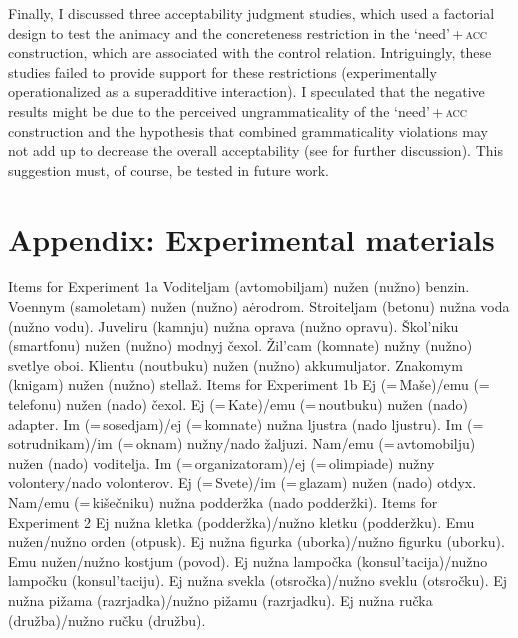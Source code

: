 \documentclass[output=paper]{langscibook}
\begin{document}
Finally, I discussed three acceptability judgment studies, which used a factorial design to test the animacy and the concreteness restriction in the `need'\,+\,\textsc{acc} construction, which are associated with the control relation. Intriguingly, these studies failed to provide support for these restrictions (experimentally operationalized as a superadditive interaction). I speculated that the negative results might be due to the perceived ungrammaticality of the `need'\,+\,\textsc{acc} construction and the hypothesis that combined grammaticality violations may not add up to decrease the overall acceptability (see \citealt{Hofmeister.Casasanto.Staum.Sag2014} for further discussion). This suggestion must, of course, be tested in future work.

\section*{Appendix: Experimental materials}

\ea Items for Experiment 1a
\ea Voditeljam (avtomobiljam) nužen (nužno) benzin.
\ex  Voennym (samoletam) nužen (nužno) aėrodrom.
\ex  Stroiteljam (betonu) nužna voda (nužno vodu).
\ex  Juveliru (kamnju) nužna oprava (nužno opravu).
\ex  Škol'niku (smartfonu) nužen (nužno) modnyj čexol.
\ex  Žil'cam (komnate) nužny (nužno) svetlye oboi.
\ex  Klientu (noutbuku) nužen (nužno) akkumuljator.
\ex  Znakomym (knigam) nužen (nužno) stellaž.
\z \ex Items for Experiment 1b
\ea Ej (=\,Maše)\slash emu (=\,telefonu) nužen (nado) čexol.
\ex Ej (=\,Kate)\slash emu (=\,noutbuku) nužen (nado) adapter.
\ex  Im (=\,sosedjam)\slash ej (=\,komnate) nužna ljustra (nado ljustru).
\ex  Im (=\,sotrudnikam)\slash im (=\,oknam) nužny\slash nado žaljuzi.
\ex  Nam\slash emu (=\,avtomobilju) nužen (nado) voditelja.
\ex  Im (=\,organizatoram)\slash ej (=\,olimpiade) nužny volontery\slash nado volonterov.
\ex  Ej (=\,Svete)\slash im (=\,glazam) nužen (nado) otdyx.
\ex  Nam\slash emu (=\,kišečniku) nužna podderžka (nado podderžki).
\z \ex Items for Experiment 2
\ea Ej nužna kletka (podderžka)\slash nužno  kletku (podderžku).
\ex Emu nužen\slash nužno  orden (otpusk).
\ex Ej nužna figurka (uborka)\slash nužno  figurku (uborku).
\ex Emu nužen\slash nužno  kostjum (povod).
\ex Ej nužna lampočka (konsul'tacija)\slash nužno  lampočku (konsul'taciju).
\ex Ej nužna svekla (otsročka)\slash nužno  sveklu (otsročku).
\ex Ej nužna pižama (razrjadka)\slash nužno  pižamu (razrjadku).
\ex Ej nužna ručka (družba)\slash nužno  ručku (družbu).
\z \z
\end{document}
